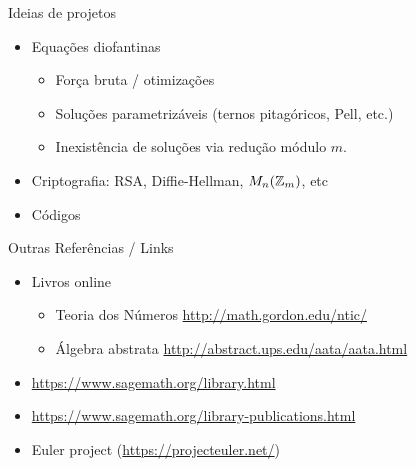 \documentclass[12pt]{beamer}
\begin{document}
\begin{frame}
  {Ideias de projetos}
  \begin{itemize}
    \item Equações diofantinas
    \begin{itemize}
      \item Força bruta / otimizações
      \item Soluções parametrizáveis (ternos pitagóricos, Pell, etc.)
      \item Inexistência de soluções via redução módulo $m$.
    \end{itemize}
    \item Criptografia: RSA, Diffie-Hellman, $M_n(\mathbb{Z}_m)$, etc
    \item Códigos
  \end{itemize}
\end{frame}

\begin{frame}
  {Outras Referências / Links }
  \begin{itemize}
    \item Livros online
    \begin{itemize}
      \item Teoria dos Números \url{http://math.gordon.edu/ntic/}
      \item Álgebra abstrata \url{http://abstract.ups.edu/aata/aata.html}
    \end{itemize}
    \item \url{https://www.sagemath.org/library.html}
    \item \url{https://www.sagemath.org/library-publications.html}
    \item Euler project (\url{https://projecteuler.net/})
  \end{itemize}
\end{frame}
\end{document}

